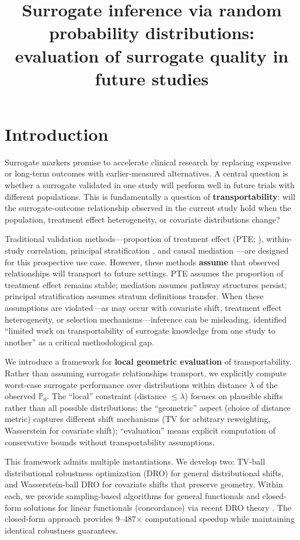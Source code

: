 \documentclass{article}
\title{Surrogate inference via random probability distributions: evaluation of surrogate quality in future studies}
\newcommand{\PP}{\mathbb{P}}
\begin{document}
\maketitle

\section{Introduction}

Surrogate markers promise to accelerate clinical research by replacing expensive or long-term outcomes with earlier-measured alternatives. A central question is whether a surrogate validated in one study will perform well in future trials with different populations. This is fundamentally a question of \textbf{transportability}: will the surrogate-outcome relationship observed in the current study hold when the population, treatment effect heterogeneity, or covariate distributions change?

Traditional validation methods---proportion of treatment effect (PTE; \cite{chen2003pte}), within-study correlation, principal stratification \cite{frangakis2002principal}, and causal mediation \cite{vanderweele2015mediation}---are designed for this prospective use case. However, these methods \textbf{assume} that observed relationships will transport to future settings. PTE assumes the proportion of treatment effect remains stable; mediation assumes pathway structures persist; principal stratification assumes stratum definitions transfer. When these assumptions are violated---as may occur with covariate shift, treatment effect heterogeneity, or selection mechanisms---inference can be misleading. \cite{parast2024} identified ``limited work on transportability of surrogate knowledge from one study to another'' as a critical methodological gap.

We introduce a framework for \textbf{local geometric evaluation} of transportability. Rather than assuming surrogate relationships transport, we explicitly compute worst-case surrogate performance over distributions within distance $\lambda$ of the observed $\PP_0$. The ``local'' constraint (distance $\leq \lambda$) focuses on plausible shifts rather than all possible distributions; the ``geometric'' aspect (choice of distance metric) captures different shift mechanisms (TV for arbitrary reweighting, Wasserstein for covariate shift); ``evaluation'' means explicit computation of conservative bounds without transportability assumptions.

This framework admits multiple instantiations. We develop two: TV-ball distributional robustness optimization (DRO) for general distributional shifts, and Wasserstein-ball DRO for covariate shifts that preserve geometry. Within each, we provide sampling-based algorithms for general functionals and closed-form solutions for linear functionals (concordance) via recent DRO theory \cite{bentalnemirovski2013, esfahanikuhn2018}. The closed-form approach provides 9--487$\times$ computational speedup while maintaining identical robustness guarantees.
\end{document}
